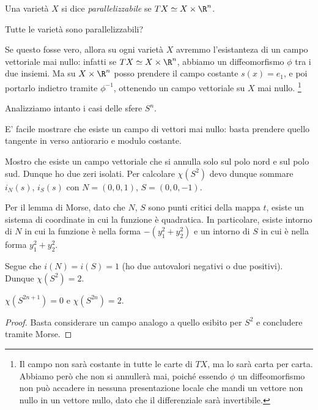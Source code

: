 
\begin{defn}
 Una varietà $X$ si dice \emph{parallelizzabile} se $TX\simeq X\times\R^n$.
\end{defn}
Tutte le varietà sono parallelizzabili?
\begin{oss}
 Se questo fosse vero, allora su ogni varietà $X$ avremmo l'esistanteza di un campo vettoriale mai nullo: infatti se $TX\simeq X\times\R^n$, abbiamo un diffeomorfismo $\phi$ tra i due insiemi.
 Ma su $X\times\R^n$ posso prendere il campo costante $s(x)=e_1$, e poi portarlo indietro tramite $\phi^{-1}$, ottenendo un campo vettoriale su $X$ mai nullo.
\footnote{Il campo non sarà costante in tutte le carte di $TX$, ma lo sarà carta per carta. Abbiamo però che non si annullerà mai, poiché essendo $\phi$ un diffeomorfismo non può accadere in nessuna presentazione locale che mandi un vettore non nullo in un vettore nullo, dato che il differenziale sarà invertibile.}

\end{oss}
Analizziamo intanto i casi delle sfere $S^n$.
\begin{es}[$S^1$]
 E' facile mostrare che esiste un campo di vettori mai nullo: basta prendere quello tangente in verso antiorario e modulo costante.
\end{es}
\begin{es}[$S^2$]
 Mostro che esiste un campo vettoriale che si annulla solo sul polo nord e sul polo sud.
 Dunque ho due zeri isolati. Per calcolare $\chi(S^2)$ devo dunque sommare $i_N(s)$, $i_S(s)$ con $N= (0,0,1)$, $S=(0,0,-1)$.
 \begin{oss} Per il lemma di Morse, dato che $N$, $S$ sono punti critici della mappa $t$, esiste un sistema di coordinate in cui la funzione è quadratica. 
 In particolare, esiste intorno di $N$ in cui la funzione è nella forma $-(y_1^2+y_2^2)$ e un intorno di $S$ in cui è nella forma $y_1^2+y_2^2$.
 \end{oss}
 Segue che $i(N)=i(S)=1$ (ho due autovalori negativi o due positivi).
 Dunque $\chi(S^2)=2$.
\end{es}
\begin{prop}
 $\chi(S^{2n+1})=0$ e $\chi(S^{2n})=2$.
 \end{prop}
 \begin{proof}
  Basta considerare un campo analogo a quello esibito per $S^{2}$ e concludere tramite Morse.
 \end{proof}

